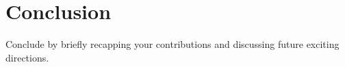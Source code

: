 \chapter{Conclusion}\label{ch:conc}

Conclude by briefly recapping your contributions and discussing future exciting directions.